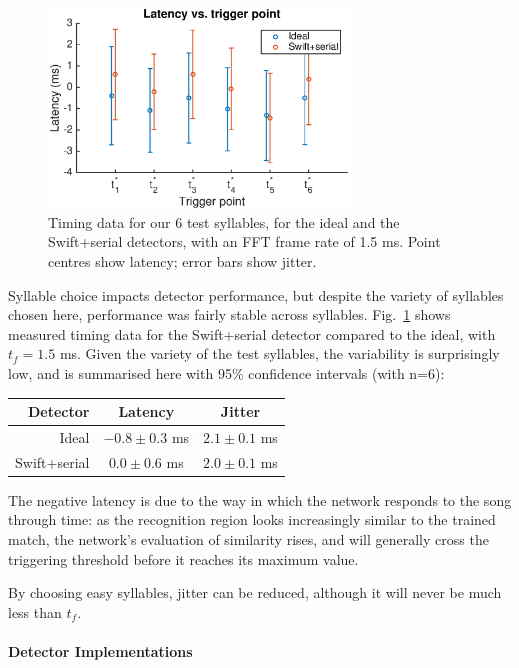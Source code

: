 \documentclass[10pt,letterpaper]{article}
\newcommand\fig[1]{Fig.~\ref{#1}}
\renewcommand{\subsubsection}[1]{\paragraph{#1}}
\begin{document}
\begin{figure}
  \begin{center}
    \includegraphics[width=8cm]{TimingVsSyllable}
  \end{center}
  \caption{Timing data for our 6 test syllables, for the ideal and the Swift+serial detectors, with an FFT frame rate of 1.5 ms.  Point centres show latency; error bars show jitter.}
  \label{fig:TimingVsSyllable}
\end{figure}

Syllable choice impacts detector performance, but despite the variety of syllables chosen here, performance was fairly stable across syllables.  \fig{fig:TimingVsSyllable} shows measured timing data for the Swift+serial detector compared to the ideal, with $t_f=1.5$ ms.  Given the variety of the test syllables, the variability is surprisingly low, and is summarised here with 95\% confidence intervals (with n=6):
\vspace{8pt}\par\noindent
\begin{tabular}{r|cc}
  Detector & Latency & Jitter \\ 
  \hline   Ideal & $-0.8\pm 0.3$ ms & $2.1\pm 0.1$ ms \\
  Swift+serial & $0.0\pm 0.6$ ms & $2.0\pm 0.1$ ms
\end{tabular}
\vspace{8pt}\par\noindent
The negative latency is due to the way in which the network responds to the song through time: as the recognition region looks increasingly similar to the trained match, the network's evaluation of similarity rises, and will generally cross the triggering threshold before it reaches its maximum value.

By choosing easy syllables, jitter can be reduced, although it will never be much less than $t_f$.

\subsubsection{Detector Implementations}
\end{document}
